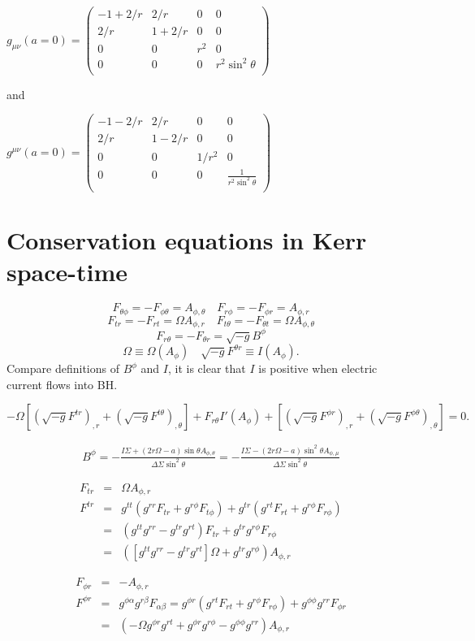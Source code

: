 \documentclass[aps,prd,preprint,groupedaddress]{revtex4-1}
\def\nn{\nonumber}
\def\beq{\begin{equation}}
\def\beqn{\begin{eqnarray}}
\def\eeq{\end{equation}}
\def\eeqn{\end{eqnarray}}
\def\sst{\sin^2\theta}
\def\Ar{A_{\phi,r}}
\def\Am{A_{\phi,\mu}}
\begin{document}
$g_{\mu\nu}(a=0)=\left(
  \begin{array}{cccc}
    -1+2/r &2/r & 0 & 0 \\
    2/r & 1+2/r & 0 & 0 \\
    0 & 0 & r^2 & 0 \\
    0 & 0 & 0 & r^2\sin^2\theta \\
  \end{array}
\right)$

and

$g^{\mu\nu}(a=0)=\left(
  \begin{array}{cccc}
    -1-2/r &2/r & 0 & 0 \\
    2/r & 1-2/r & 0 & 0 \\
    0 & 0 & 1/r^2 & 0 \\
    0 & 0 & 0 & \frac{1}{r^2\sst} \\
  \end{array}
\right)$



\section{Conservation equations in Kerr space-time}
\beq
F_{\theta\phi}=-F_{\phi\theta}=A_{\phi,\theta}\quad F_{r\phi}=-F_{\phi r}=A_{\phi,r}
\eeq
\beq
F_{tr}=-F_{rt}=\Omega A_{\phi,r}\quad F_{t\theta}=-F_{\theta t}=\Omega A_{\phi,\theta}
\eeq
\beq
F_{r\theta}=-F_{\theta r}=\sqrt{-g}B^{\phi}
\eeq
\beq
\Omega \equiv \Omega(A_\phi) \quad \sqrt{-g}F^{\theta r}\equiv I(A_\phi).
\eeq
Compare definitions of $B^\phi$ and $I$, it is clear that $I$ is positive when electric current flows into BH.

\beq
-\Omega\left[(\sqrt{-g}F^{tr})_{,r}+(\sqrt{-g}F^{t\theta})_{,\theta}\right]
+F_{r\theta}I'(A_\phi)
+\left[(\sqrt{-g}F^{\phi r})_{,r}+(\sqrt{-g}F^{\phi\theta})_{,\theta} \right]=0.
\eeq

\beqn
B^\phi
= -\frac{I\Sigma+(2r\Omega-a)\sin\theta A_{\phi,\theta}}{\Delta\Sigma\sin^2\theta}
= -\frac{I\Sigma-(2r\Omega-a)\sst \Am}{\Delta\Sigma\sin^2\theta}
\eeqn


\beqn
F_{tr}&=&\Omega \Ar\nn\\
F^{tr}&=&g^{tt}(g^{rr}F_{tr}+g^{r\phi}F_{t\phi})+g^{tr}(g^{rt}F_{rt}+g^{r\phi}F_{r\phi}) \nn\\
&=&(g^{tt}g^{rr}-g^{tr}g^{rt})F_{tr}+g^{tr}g^{r\phi}F_{r\phi} \nn\\
&=&\left([g^{tt}g^{rr}-g^{tr}g^{rt}]\Omega+g^{tr}g^{r\phi} \right)\Ar
\eeqn

\beqn
F_{\phi r}
&=&- A_{\phi,r} \\
F^{\phi r}
&=&g^{\phi\alpha}g^{r\beta}F_{\alpha\beta}
=g^{\phi r}(g^{rt}F_{rt}+g^{r\phi}F_{r\phi})+g^{\phi\phi}g^{rr}F_{\phi r}\\
&=&(-\Omega g^{\phi r}g^{rt}+ g^{\phi r}g^{r\phi} -g^{\phi\phi}g^{rr})\Ar
\eeqn
\end{document}
